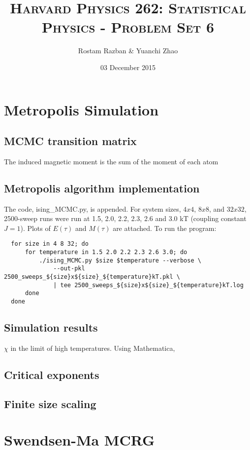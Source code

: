 \documentclass[11pt, letterpaper]{scrartcl} %
\title{	
\normalfont \normalsize 
\textsc{Harvard Physics 262: Statistical Physics - Problem Set 6} \\ [20pt] %
}
\author{Rostam Razban & Yuanchi Zhao} %
\date{\normalsize 03 December 2015} %
\numberwithin{equation}{section} %
\numberwithin{figure}{section} %
\numberwithin{table}{section} %
\begin{document}
\maketitle %

\section{Metropolis Simulation}

\subsection{MCMC transition matrix}

The induced magnetic moment is the sum of the moment of each atom

\subsection{Metropolis algorithm implementation}

The code, ising\_MCMC.py, is appended. For system sizes, $4x4$, $8x8$,
and $32x32$, 2500-sweep runs were run at 1.5, 2.0, 2.2, 2.3, 2.6 and
3.0 kT (coupling constant $J=1$). Plots of $E(\tau)$ and $M(\tau)$ are
attached. To run the program:

\begin{lstlisting}
  for size in 4 8 32; do
      for temperature in 1.5 2.0 2.2 2.3 2.6 3.0; do
          ./ising_MCMC.py $size $temperature --verbose \
              --out-pkl 2500_sweeps_${size}x${size}_${temperature}kT.pkl \
              | tee 2500_sweeps_${size}x${size}_${temperature}kT.log
      done
  done
\end{lstlisting}


\subsection{Simulation results}

$\chi$ in the limit of high temperatures. Using Mathematica,


\subsection{Critical exponents}


\subsection{Finite size scaling}


\section{Swendsen-Ma MCRG}


\end{document}
